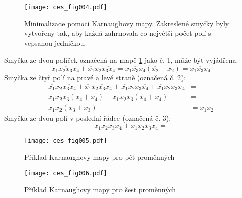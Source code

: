       \begin{figure}[ht!] %
        \centering
        \texttt{[image: ces\_fig004.pdf]}
        \caption{Minimalizace pomocí Karnaughovy mapy. Zakreslené smyčky byly vytvořeny tak, aby 
                 každá zahrnovala co největší počet polí s vepsanou 
                 jedničkou.}
        \label{ces:fig004}
      \end{figure}     
     Smyčka ze dvou políček označená na mapě \ref{ces:fig004} jako č. 1, může být vyjádřena:  
     \begin{equation}
       \overline{x_1x_2x_3x_4} + \overline{x_1}x_2\overline{x_3x_4} = \overline{x_1x_3x_4}(\overline{x_2} + x_2) =
       \overline{x_1x_3x_4}
     \end{equation}
     Smyčka ze čtyř polí na pravé a levé straně (označená č. 2):
     \begin{align}
       \overline{x_1}x_2\overline{x_3x_4} + 
       \overline{x_1}x_2\overline{x_3}x_4 + 
       \overline{x_1}x_2x_3\overline{x_4} +
       \overline{x_1}x_2x_3x_4                                &=               \\ \nonumber
       \overline{x_1}x_2\overline{x_3}(\overline{x_4}+x_4) +  
       \overline{x_1}x_2x_3(\overline{x_4}+x_4)               &=               \\ \nonumber
       \overline{x_1}x_2(\overline{x_3}+x_3)                  &= 
       \overline{x_1}x_2 
     \end{align}
     Smyčka ze dvou polí v poslední řádce (označená č. 3):
     \begin{equation}
       x_1\overline{x_2x_3}x_4 + x_1\overline{x_2}x_3x_4 = 
     \end{equation}

      \begin{figure}[ht!] %
        \centering
        \texttt{[image: ces\_fig005.pdf]}
        \caption{Příklad Karnaughovy mapy pro pět proměnných}
        \label{ces:fig005}
      \end{figure}

      \begin{figure}[ht!] %
        \centering
        \texttt{[image: ces\_fig006.pdf]}
        \caption{Příklad Karnaughovy mapy pro šest proměnných}
        \label{ces:fig006}
      \end{figure}

